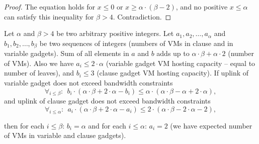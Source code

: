 \documentclass[9pt]{sigcomm-alternate}
\newcommand{\maciek}[1]{\textcolor{brown}{maciek: #1}}
\newcommand{\clauses}{\alpha}
\newcommand{\variables}{\beta}
\begin{document}
\begin{appendix}
\begin{proof}
The equation holds for $x \leq 0$ or $x \geq \clauses \cdot (\variables - 2)$,
and no
positive $x \leq \clauses$ can satisfy this inequality for $\variables > 4$. Contradiction.
\end{proof}
\begin{lemma}\label{lem:bandwidth-lemma}
  Let $\clauses$ and $\variables > 4$ be two arbitrary positive integers. Let $a_1, a_2, \ldots,
  a_{\clauses}$ and $b_1, b_2, \ldots,
  b_{\variables}$ be two sequences of integers (numbers of VMs in clause and in variable gadgets). Sum of all elements in $a$ and $b$ adds up to
  $\clauses \cdot \variables + \clauses \cdot 2$ (number of VMs). Also
  we have $a_i \leq 2 \cdot \clauses$
  (variable gadget VM hosting capacity -- equal to number of leaves),
  and $b_i \leq 3$ (clause gadget VM hosting capacity). If uplink of variable gadget does not exceed bandwidth constraints
  $$ \forall_{i\leq\variables}:~~ b_i \cdot (\clauses \cdot \variables
  + 2\cdot \clauses- b_i) \leq \clauses \cdot (\clauses \cdot \variables -
  \clauses + 2 \cdot \clauses), $$
and uplink of clause gadget does not exceed bandwidth constraints
$$ \forall_{i\leq\clauses}:~~ a_i \cdot (\clauses \cdot \variables + 2 \cdot \clauses - a_i) \leq 2 \cdot (\clauses \cdot \variables -
  2 \cdot \clauses - 2), $$

\noindent  then for each $i\leq \variables$: $b_i = \clauses$ and for
each $i\leq\clauses$: $a_i = 2$ (we have expected number of VMs in variable and clause gadgets).
\end{lemma}



\end{appendix}
\end{document}
